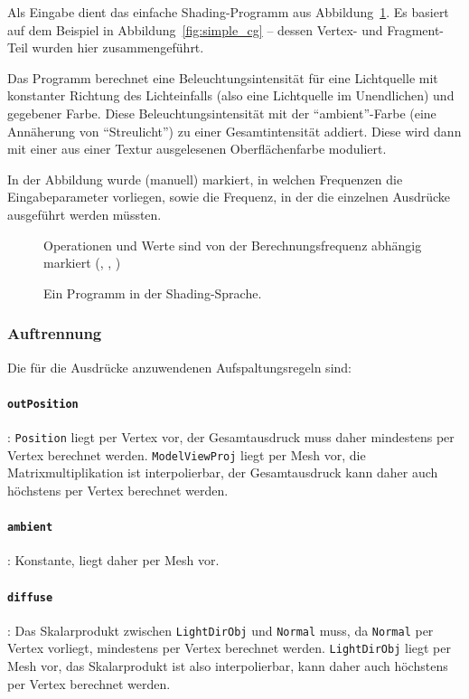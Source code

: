 \documentclass[twoside,a4paper,fleqn,12pt]{book}
\begin{document}
Als Eingabe dient das einfache Shading-Programm aus Abbildung~\ref{fig:simple_s1}.
Es basiert auf dem Beispiel in Abbildung~\ref{fig:simple_cg} -- dessen Vertex- und Fragment-Teil wurden hier zusammengeführt.

Das Programm berechnet eine Beleuchtungsintensität für eine Lichtquelle mit konstanter Richtung des Lichteinfalls (also eine Lichtquelle im
Unendlichen) und gegebener Farbe. Diese Beleuchtungsintensität mit der ``ambient''-Farbe (eine Annäherung von "`Streulicht"')
zu einer Gesamtintensität addiert. Diese wird dann mit einer aus einer Textur ausgelesenen Oberflächenfarbe moduliert.

In der Abbildung wurde (manuell) markiert, in welchen Frequenzen die Eingabeparameter vorliegen,
sowie die Frequenz, in der die einzelnen Ausdrücke ausgeführt werden müssten.

\begin{figure}[ht]
  
  \caption{Ein Programm in der Shading-Sprache.}
  \centering
  \small Operationen und Werte sind von der Berechnungsfrequenz abhängig markiert (, , )
  \label{fig:simple_s1}
\end{figure}

\subsubsection{Auftrennung}

Die für die Ausdrücke anzuwendenen Aufspaltungsregeln sind:

\paragraph{\texttt{outPosition}}: \texttt{Position} liegt per Vertex vor, der Gesamtausdruck muss daher mindestens per Vertex
berechnet werden. \texttt{ModelViewProj} liegt per Mesh vor, die Matrixmultiplikation ist interpolierbar,
der Gesamtausdruck kann daher auch höchstens per Vertex berechnet werden.

\paragraph{\texttt{ambient}}: Konstante, liegt daher per Mesh vor.

\paragraph{\texttt{diffuse}}: Das Skalarprodukt zwischen \texttt{LightDirObj} und \texttt{Normal} muss, da \texttt{Normal} per Vertex vorliegt,
mindestens per Vertex berechnet werden. \texttt{LightDirObj} liegt per Mesh vor, das Skalarprodukt ist also interpolierbar,
kann daher auch höchstens per Vertex berechnet werden.
\end{document}
